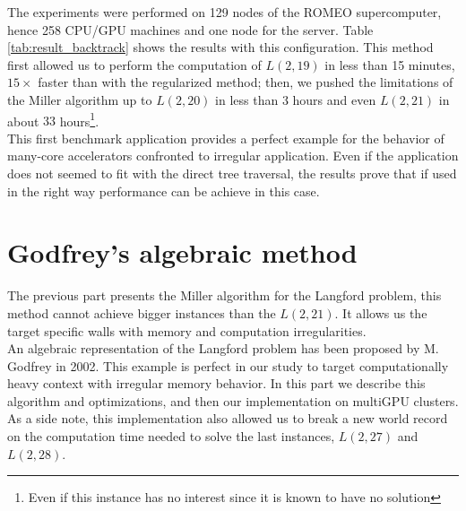 The experiments were performed on 129 nodes of the ROMEO supercomputer, hence 258 CPU/GPU machines and one node for the server. 
Table \ref{tab:result_backtrack} shows the results with this configuration. 
This method first allowed us to perform the computation of $L(2,19)$ in less than 15 minutes, $15\times$ faster than with the regularized method; then, we pushed the limitations of the Miller algorithm up to $L(2,20)$ in less than 3 hours and even $L(2,21)$ in about $33$ hours\footnote{Even if this instance has no interest since it is known to have no solution}.\\

This first benchmark application provides a perfect example for the behavior of many-core accelerators confronted to irregular application.
Even if the application does not seemed to fit with the direct tree traversal, the results prove that if used in the right way performance can be achieve in this case. 



\section{Godfrey's algebraic method}
The previous part presents the Miller algorithm for the Langford problem, this method cannot achieve bigger instances than the $L(2,21)$.
It allows us the target specific walls with memory and computation irregularities.\\
An algebraic representation of the Langford problem has been proposed by M. Godfrey in 2002.
This example is perfect in our study to target computationally heavy context with irregular memory behavior.
In this part we describe this algorithm and optimizations, and then our implementation on multiGPU clusters.
As a side note, this implementation also allowed us to break a new world record on the computation time needed to solve the last instances, $L(2,27)$ and $L(2,28)$.
